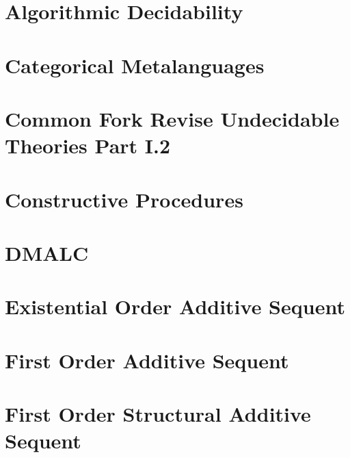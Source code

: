 \documentclass{report}
\begin{document}
\chapter{Algorithmic Decidability}


\chapter{Categorical Metalanguages}


\chapter{Common Fork Revise Undecidable Theories Part I.2}


\chapter{Constructive Procedures}


\chapter{DMALC}


\chapter{Existential Order Additive Sequent}


\chapter{First Order Additive Sequent}


\chapter{First Order Structural Additive Sequent}


%
\end{document}
